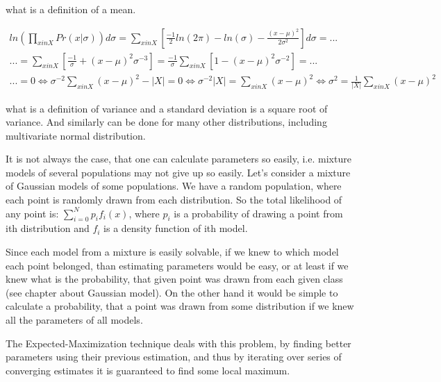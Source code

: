 \documentclass[12pt,a4paper,english]{article}
\begin{document}
what is a definition of a mean. \newline 

\begin{multline}
    ln(\prod_{x in X} Pr(x | \sigma))d\sigma = \sum_{x in X}[\frac {-1} 2 ln(2\pi)-ln(\sigma)- \frac {(x-\mu)^2} {2 \sigma^2} ]d\sigma = ... \\
    ...= \sum_{x in X}[\frac {-1} \sigma + (x-\mu)^2 \sigma^{-3}] = \frac {-1} {\sigma} \sum_{x in X}[1-(x-\mu)^2 \sigma^{-2}]=... \\
    ...= 0 \iff \sigma^{-2} \sum_{x in X}(x-\mu)^2 - | X |=0 \iff \sigma^{-2} | X | = \sum_{x in X}(x-\mu)^2 \iff \sigma^2 = \frac 1 {|X|} \sum_{x in X}(x-\mu)^2
\end{multline}

what is a definition of variance and a standard deviation is a square root of variance. \newline
And similarly can be done for many other distributions, including multivariate normal distribution. \newline

\newpage

It is not always the case, that one can calculate parameters so easily, i.e. mixture models of several populations may not give up so easily.
Let's consider a mixture of Gaussian models of some populations. We have a random population, where each point is randomly drawn from each distribution. 
So the total likelihood of any point is: $\sum_{i=0}^N p_i f_i(x)$, where $p_i$ is a probability of drawing a point from ith distribution and $f_i$ is a density function of ith model. \newline

Since each model from a mixture is easily solvable, if we knew to which model each point belonged, than estimating parameters would be easy,
or at least if we knew what is the probability, that given point was drawn from each given class (see chapter about Gaussian model). \newline
On the other hand it would be simple to calculate a probability, that a point was drawn from some distribution if we knew all the parameters of all models. \newline


The Expected-Maximization technique deals with this problem, by finding better parameters using their previous estimation, and thus by iterating over series of converging estimates it is guaranteed to find some local maximum. \newline
\end{document}
